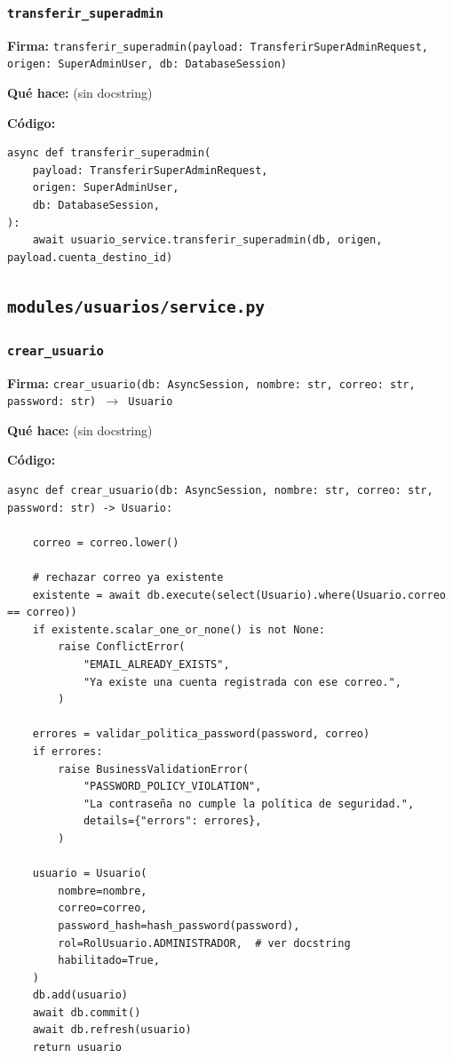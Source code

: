 \documentclass[11pt,a4paper]{article}
\begin{document}
\subsubsection*{\texttt{transferir\_superadmin}}
\textbf{Firma:} \texttt{transferir\_superadmin(payload: TransferirSuperAdminRequest, origen: SuperAdminUser, db: DatabaseSession)}

\textbf{Qué hace:} (sin docstring)

\textbf{Código:}
\begin{lstlisting}
async def transferir_superadmin(
    payload: TransferirSuperAdminRequest,
    origen: SuperAdminUser,
    db: DatabaseSession,
):
    await usuario_service.transferir_superadmin(db, origen, payload.cuenta_destino_id)
\end{lstlisting}

\subsection{\texttt{modules/usuarios/service.py}}

\subsubsection*{\texttt{crear\_usuario}}
\textbf{Firma:} \texttt{crear\_usuario(db: AsyncSession, nombre: str, correo: str, password: str) $\rightarrow$ Usuario}

\textbf{Qué hace:} (sin docstring)

\textbf{Código:}
\begin{lstlisting}
async def crear_usuario(db: AsyncSession, nombre: str, correo: str, password: str) -> Usuario:

    correo = correo.lower()

    # rechazar correo ya existente
    existente = await db.execute(select(Usuario).where(Usuario.correo == correo))
    if existente.scalar_one_or_none() is not None:
        raise ConflictError(
            "EMAIL_ALREADY_EXISTS",
            "Ya existe una cuenta registrada con ese correo.",
        )

    errores = validar_politica_password(password, correo)
    if errores:
        raise BusinessValidationError(
            "PASSWORD_POLICY_VIOLATION",
            "La contraseña no cumple la política de seguridad.",
            details={"errors": errores},
        )

    usuario = Usuario(
        nombre=nombre,
        correo=correo,
        password_hash=hash_password(password),
        rol=RolUsuario.ADMINISTRADOR,  # ver docstring
        habilitado=True,
    )
    db.add(usuario)
    await db.commit()
    await db.refresh(usuario)
    return usuario
\end{lstlisting}
\end{document}
